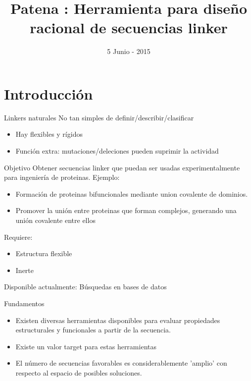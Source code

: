 \documentclass{beamer}
\title{Patena : Herramienta para diseño racional de secuencias linker}
\date{5 Junio - 2015}
\begin{document}
\begin{frame}
 \titlepage
\end{frame}

\section{Introducción}

\begin{frame}{Linkers naturales}
 No tan simples de definir/describir/clasificar
 \begin{itemize}
  \item Hay flexibles y rígidos    %
  \item Función extra: mutaciones/deleciones pueden suprimir la actividad    %
  \end{itemize}
 
\end{frame}

\begin{frame}{Objetivo}
Obtener secuencias linker que puedan ser usadas experimentalmente 
para ingeniería de proteinas. Ejemplo: 
\begin{itemize}
 \item Formación de proteinas bifuncionales mediante union covalente de dominios.
 \item Promover la unión entre proteinas que forman complejos, generando una unión covalente entre ellos
\end{itemize}

Requiere:
\begin{itemize}
 \item Estructura flexible
 \item Inerte
\end{itemize}
Disponible actualmente: Búsquedas en bases de datos
\end{frame}



\begin{frame}{Fundamentos}
 \begin{itemize}
  \item Existen diversas herramientas disponibles para evaluar propiedades estructurales y funcionales a partir de la secuencia.
  \item Existe un valor target para estas herramientas 
  \item El número de secuencias favorables es considerablemente 'amplio' con respecto al espacio de posibles soluciones.
 \end{itemize}
\end{frame}
\end{document}
